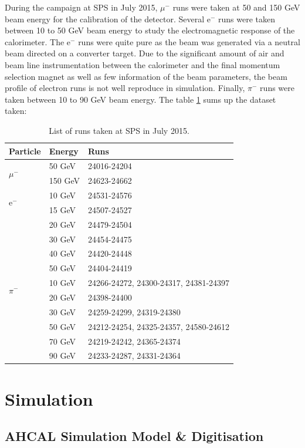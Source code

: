 \documentclass[twoside,a4paper,11pt]{article}
\begin{document}
During the campaign at SPS in July 2015, $\mu^-$ runs were taken at 50 and 150 GeV beam energy for the calibration of the detector. Several e$^{-}$ runs were taken between 10 to 50 GeV beam energy to study the electromagnetic response of the calorimeter. The e$^{-}$ runs were quite pure as the beam was generated via a neutral beam directed on a converter target. Due to the significant amount of air and beam line instrumentation between the calorimeter and the final momentum selection magnet as well as few information of the beam parameters, the beam profile of electron runs is not well reproduce in simulation. Finally, $\pi^-$ runs were taken between 10 to 90 GeV beam energy. The table \ref{table:dataruns} sums up the dataset taken:
\begin{table}[htbp]
\centering
  \begin{tabular}{@{}l||p{2cm}p{8cm}@{}}
    \hline
    \multicolumn{1}{l}{\textbf{Particle}} & \textbf{Energy} & \textbf{Runs}\\
    \hline
    \multirow{2}{*}{$\mu^-$}& 50 GeV & 24016-24204\\& 150 GeV & 24623-24662\\
    \hline
    \multirow{2}{*}{e$^-$}& 10 GeV & 24531-24576\\& 15 GeV & 24507-24527\\& 20 GeV & 24479-24504\\& 30 GeV & 24454-24475\\& 40 GeV & 24420-24448\\& 50 GeV & 24404-24419\\
    \hline
    \multirow{2}{*}{$\pi^-$}& 10 GeV & 24266-24272, 24300-24317, 24381-24397\\& 20 GeV & 24398-24400\\& 30 GeV & 24259-24299, 24319-24380\\& 50 GeV & 24212-24254, 24325-24357, 24580-24612\\& 70 GeV & 24219-24242, 24365-24374\\& 90 GeV & 24233-24287, 24331-24364\\
    \hline
    \end{tabular}
  \caption{List of runs taken at SPS in July 2015.}
  \label{table:dataruns}
\end{table}

\section{Simulation}

\subsection{AHCAL Simulation Model \& Digitisation}
\end{document}
